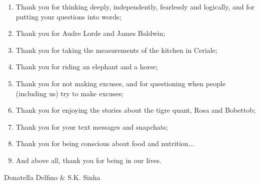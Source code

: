 \documentclass[11pt,dvipsnames]{article}
\newenvironment{myfont}{\fontfamily{frc}\selectfont}{\par}
\begin{document}
\begin{enumerate}[label= {$\heartsuit${\arabic*:}}]
\item Thank you for thinking deeply, independently, fearlessly and logically, and for putting your questions into words;
\item Thank you for Audre Lorde and James Baldwin;
\item Thank you for taking the measurements of the kitchen in Ceriale;
\item Thank you for riding an elephant and a horse;
\item Thank you for not making excuses, and for questioning when people (including us) try to make excuses;
\item Thank you for enjoying the stories about the tigre quant, Rosa and Bobettob;
\item Thank you for your text messages and snapchats;
\item Thank you for being conscious about food and nutrition...
\item And above all, thank you for being in our lives. 





\end{enumerate}
\begin{center}
\begin{myfont}
Donatella Delfino \& S.K. Sinha
\end{myfont}
\end{center}
\end{document}
